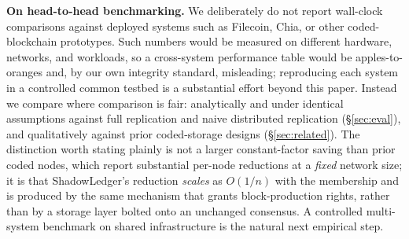 \textbf{On head-to-head benchmarking.} We deliberately do not report wall-clock comparisons against
deployed systems such as Filecoin, Chia, or other coded-blockchain prototypes. Such numbers would
be measured on different hardware, networks, and workloads, so a cross-system performance table
would be apples-to-oranges and, by our own integrity standard, misleading; reproducing each system
in a controlled common testbed is a substantial effort beyond this paper. Instead we compare where
comparison is fair: analytically and under identical assumptions against full replication and naive
distributed replication (\S\ref{sec:eval}), and qualitatively against prior coded-storage designs
(\S\ref{sec:related}). The distinction worth stating plainly is not a larger constant-factor saving
than prior coded nodes, which report substantial per-node reductions at a \emph{fixed} network size;
it is that ShadowLedger's reduction \emph{scales} as $O(1/n)$ with the membership and is produced by
the same mechanism that grants block-production rights, rather than by a storage layer bolted onto an
unchanged consensus. A controlled multi-system benchmark on shared infrastructure is the natural next
empirical step.
